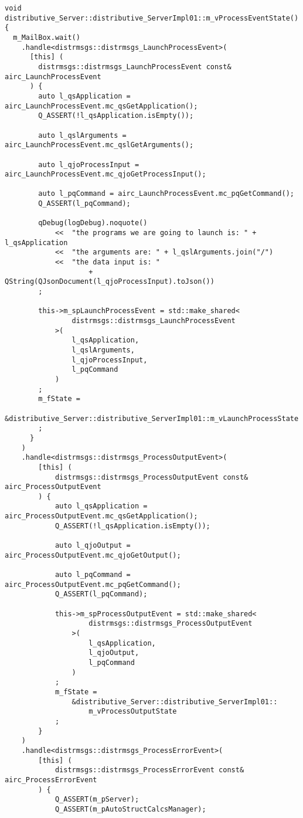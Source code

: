\begin{verbatim}
void distributive_Server::distributive_ServerImpl01::m_vProcessEventState()   {
  m_MailBox.wait()
    .handle<distrmsgs::distrmsgs_LaunchProcessEvent>(
      [this] (
        distrmsgs::distrmsgs_LaunchProcessEvent const& airc_LaunchProcessEvent
      ) {
        auto l_qsApplication =  airc_LaunchProcessEvent.mc_qsGetApplication();
        Q_ASSERT(!l_qsApplication.isEmpty());

        auto l_qslArguments = airc_LaunchProcessEvent.mc_qslGetArguments();

        auto l_qjoProcessInput = airc_LaunchProcessEvent.mc_qjoGetProcessInput();

        auto l_pqCommand = airc_LaunchProcessEvent.mc_pqGetCommand();
        Q_ASSERT(l_pqCommand);

        qDebug(logDebug).noquote()
            <<  "the programs we are going to launch is: " + l_qsApplication
            <<  "the arguments are: " + l_qslArguments.join("/")
            <<  "the data input is: "
                    + QString(QJsonDocument(l_qjoProcessInput).toJson())
        ;

        this->m_spLaunchProcessEvent = std::make_shared<
                distrmsgs::distrmsgs_LaunchProcessEvent
            >(
                l_qsApplication,
                l_qslArguments,
                l_qjoProcessInput,
                l_pqCommand
            )
        ;
        m_fState =
            &distributive_Server::distributive_ServerImpl01::m_vLaunchProcessState
        ;
      }
    )
    .handle<distrmsgs::distrmsgs_ProcessOutputEvent>(
        [this] (
            distrmsgs::distrmsgs_ProcessOutputEvent const& airc_ProcessOutputEvent
        ) {
            auto l_qsApplication =  airc_ProcessOutputEvent.mc_qsGetApplication();
            Q_ASSERT(!l_qsApplication.isEmpty());

            auto l_qjoOutput = airc_ProcessOutputEvent.mc_qjoGetOutput();

            auto l_pqCommand = airc_ProcessOutputEvent.mc_pqGetCommand();
            Q_ASSERT(l_pqCommand);

            this->m_spProcessOutputEvent = std::make_shared<
                    distrmsgs::distrmsgs_ProcessOutputEvent
                >(
                    l_qsApplication,
                    l_qjoOutput,
                    l_pqCommand
                )
            ;
            m_fState =
                &distributive_Server::distributive_ServerImpl01::
                    m_vProcessOutputState
            ;
        }
    )
    .handle<distrmsgs::distrmsgs_ProcessErrorEvent>(
        [this] (
            distrmsgs::distrmsgs_ProcessErrorEvent const& airc_ProcessErrorEvent
        ) {
            Q_ASSERT(m_pServer);
            Q_ASSERT(m_pAutoStructCalcsManager);


\end{verbatim}
